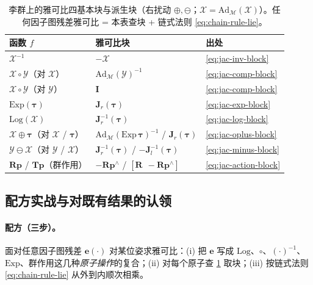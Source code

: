 \begin{table}[H]\centering\footnotesize
\caption{李群上的雅可比四基本块与派生块（右扰动 $\oplus,\ominus$；$\boldsymbol{\mathcal{X}}=\mathrm{Ad}_{\mathcal{M}}(\mathcal{X})$）。任何因子图残差雅可比 = 本表查块 + 链式法则 \cref{eq:chain-rule-lie}。}
\label{tab:lie-jac-blocks}
\begin{tabular}{lll}
\toprule
函数 $f$ & 雅可比块 & 出处 \\
\midrule
$\mathcal{X}^{-1}$ & $-\boldsymbol{\mathcal{X}}$ & \cref{eq:jac-inv-block} \\
$\mathcal{X}\circ\mathcal{Y}$（对 $\mathcal{X}$） & $\mathrm{Ad}_{\mathcal{M}}(\mathcal{Y})^{-1}$ & \cref{eq:jac-comp-block} \\
$\mathcal{X}\circ\mathcal{Y}$（对 $\mathcal{Y}$） & $\mathbf{I}$ & \cref{eq:jac-comp-block} \\
$\mathrm{Exp}(\boldsymbol{\tau})$ & $\mathbf{J}_r(\boldsymbol{\tau})$ & \cref{eq:jac-exp-block} \\
$\mathrm{Log}(\mathcal{X})$ & $\mathbf{J}_r^{-1}(\boldsymbol{\tau})$ & \cref{eq:jac-log-block} \\
$\mathcal{X}\oplus\boldsymbol{\tau}$（对 $\mathcal{X}$ / $\boldsymbol{\tau}$） & $\mathrm{Ad}_{\mathcal{M}}(\mathrm{Exp}\,\boldsymbol{\tau})^{-1}$ / $\mathbf{J}_r(\boldsymbol{\tau})$ & \cref{eq:jac-oplus-block} \\
$\mathcal{Y}\ominus\mathcal{X}$（对 $\mathcal{Y}$ / $\mathcal{X}$） & $\mathbf{J}_r^{-1}(\boldsymbol{\tau})$ / $-\mathbf{J}_l^{-1}(\boldsymbol{\tau})$ & \cref{eq:jac-minus-block} \\
$\mathbf{R}\mathbf{p}$ / $\mathbf{T}\mathbf{p}$（群作用） & $-\mathbf{R}\mathbf{p}^\wedge$ / $[\mathbf{R}\ \ {-}\mathbf{R}\mathbf{p}^\wedge]$ & \cref{eq:jac-action-block} \\
\bottomrule
\end{tabular}
\end{table}

\subsection{配方实战与对既有结果的认领}
\label{subsec:lie-recipe}

\paragraph{配方（三步）。}面对任意因子图残差 $\mathbf{e}(\cdot)$ 对某位姿求雅可比：(i) 把 $\mathbf{e}$ 写成 $\mathrm{Log}$、$\circ$、$(\cdot)^{-1}$、$\mathrm{Exp}$、群作用这几种\emph{原子操作}的复合；(ii) 对每个原子查 \cref{tab:lie-jac-blocks} 取块；(iii) 按链式法则 \cref{eq:chain-rule-lie} 从外到内顺次相乘。

